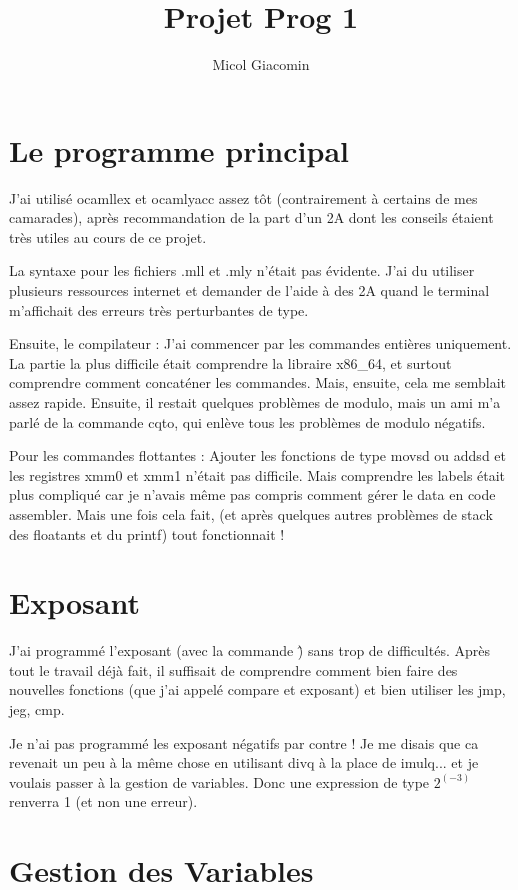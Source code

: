 \documentclass{article}
\title{Projet Prog 1}
\author{Micol Giacomin}
\begin{document}
\maketitle

\section{Le programme principal}

J'ai utilisé ocamllex et ocamlyacc assez tôt (contrairement à certains de mes camarades), après recommandation de la part d'un 2A dont les conseils étaient très utiles au cours de ce projet.


La syntaxe pour les fichiers .mll et .mly n'était pas évidente. J'ai du utiliser plusieurs ressources internet et demander de l'aide à des 2A quand le terminal m'affichait des erreurs très perturbantes de type.

Ensuite, le compilateur : J'ai commencer par les commandes entières uniquement. La partie la plus difficile était comprendre la libraire x86\_64, et surtout comprendre comment concaténer les commandes. Mais, ensuite, cela me semblait assez rapide. Ensuite, il restait quelques problèmes de modulo, mais un ami m'a parlé de la commande cqto, qui enlève tous les problèmes de modulo négatifs.


Pour les commandes flottantes : Ajouter les fonctions de type movsd ou addsd et les registres xmm0 et xmm1 n'était pas difficile. Mais comprendre les labels était plus compliqué car je n'avais même pas compris comment gérer le data en code assembler. Mais une fois cela fait, (et après quelques autres problèmes de stack des floatants et du printf) tout fonctionnait !

\section{Exposant}

J'ai programmé l'exposant (avec la commande \^) sans trop de difficultés. Après tout le travail déjà fait, il suffisait de comprendre comment bien faire des nouvelles fonctions (que j'ai appelé compare et exposant) et bien utiliser les jmp, jeg, cmp.


Je n'ai pas programmé les exposant négatifs par contre ! Je me disais que ca revenait un peu à la même chose en utilisant divq à la place de imulq... et je voulais passer à la gestion de variables. Donc une expression de type $ 2 ^ (-3) $ renverra 1 (et non une erreur).

\section{Gestion des Variables}
\end{document}
